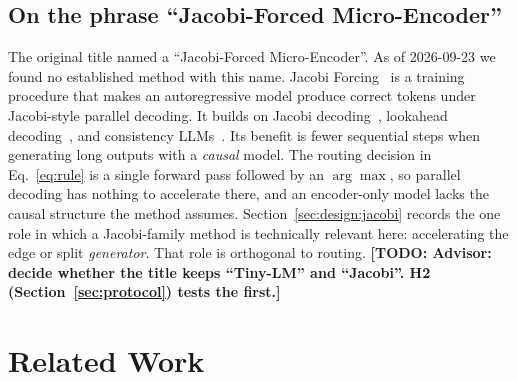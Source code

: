\documentclass[lettersize,journal]{IEEEtran}
\newcommand{\todo}[1]{\textbf{[TODO: #1]}}
\begin{document}
\subsection*{On the phrase ``Jacobi-Forced Micro-Encoder''}
The original title named a ``Jacobi-Forced Micro-Encoder''. As of 2026-09-23 we
found no established method with this name. Jacobi Forcing~\cite{hu2025fast} is
a training procedure that makes an autoregressive model produce correct tokens
under Jacobi-style parallel decoding. It builds on Jacobi decoding~\cite{song2021accelerating,santilli2023accelerating},
lookahead decoding~\cite{fu2024break}, and consistency LLMs~\cite{kou2024cllms}.
Its benefit is fewer sequential steps when generating long outputs with a
\emph{causal} model. The routing decision in Eq.~\eqref{eq:rule} is a single
forward pass followed by an $\arg\max$, so parallel decoding has nothing to
accelerate there, and an encoder-only model lacks the causal structure the
method assumes. Section~\ref{sec:design:jacobi} records the one role in which a
Jacobi-family method is technically relevant here: accelerating the edge or
split \emph{generator}. That role is orthogonal to routing. \todo{Advisor:
decide whether the title keeps ``Tiny-LM'' and ``Jacobi''. H2
(Section~\ref{sec:protocol}) tests the first.}

\section{Related Work}
\label{sec:related}
\end{document}
